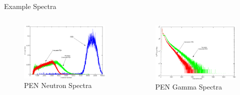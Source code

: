 \begin{frame}{Example Spectra}
\begin{columns}[onlytextwidth]
\begin{column}{0.45\textwidth}
	\begin{figure}
		\centering
		\includegraphics[width=\textwidth]{images/NeutronSpectra.eps}
		\caption{PEN Neutron Spectra}
		\label{fig:PENNeutronSpectra}
	\end{figure}
\end{column}
\begin{column}{0.45\textwidth}
	\begin{figure}
		\centering
		\includegraphics[width=\textwidth]{images/GammaSpectra.eps}
		\caption{PEN Gamma Spectra}
		\label{fig:PENGammaSpectra}
	\end{figure}
\end{column}
\end{columns}
\end{frame}

